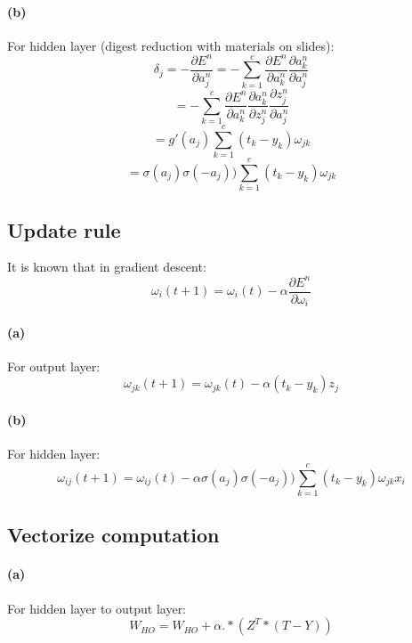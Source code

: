 \documentclass{article} %
\begin{document}
		\paragraph{(b)}
		For hidden layer (digest reduction with materials on slides): 
		\begin{equation*}
		\delta_j = -\frac{\partial E^n}{\partial a_j^n} = - \sum_{k=1}^c {\frac{\partial E^n}{\partial a_k^n}\frac{\partial a_k^n}{\partial a_j^n}} 
		\end{equation*}
		\begin{equation*}
		= - \sum_{k=1}^c {\frac{\partial E^n}{\partial a_k^n}\frac{\partial a_k^n}{\partial z_j^n} \frac{\partial z_j^n}{\partial a_j^n}}
		\end{equation*}
		\begin{equation*}
		= g'(a_j) \sum_{k=1}^c {(t_k - y_k) \omega_{jk}}
		\end{equation*}
		\begin{equation*}
		= \sigma(a_j)\sigma(-a_j)) \sum_{k=1}^c {(t_k - y_k) \omega_{jk}}
		\end{equation*}
	\subsection{Update rule}
		It is known that in gradient descent:
		\begin{equation*}
			\omega_i(t+1)=\omega_i(t) -\alpha \frac{\partial E^n}{\partial \omega_i}
		\end{equation*}
		\paragraph{(a)}
		For output layer:
			\begin{equation*}
			\omega_{jk}(t+1) = \omega_{jk}(t) - \alpha (t_k - y_k) z_j 
			\end{equation*}
		\paragraph{(b)}
		For hidden layer:
			\begin{equation*}
			\omega_{ij}(t+1) = \omega_{ij}(t) - \alpha  \sigma(a_j)\sigma(-a_j))  \sum_{k=1}^c {(t_k - y_k) \omega_{jk}} x_i
			\end{equation*}

	\subsection{Vectorize computation}
		\paragraph{(a)}
		For hidden layer to output layer:
		\begin{equation*}
		W_{HO} = W_{HO}  + \alpha .* (Z^T * (T - Y) )
		\end{equation*}
\end{document}
